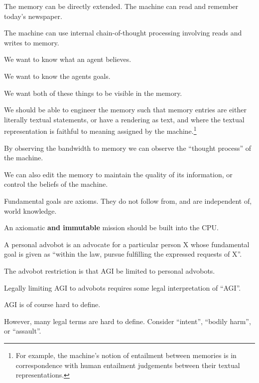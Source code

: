 {\vfill
The memory can be directly extended. The machine can read and remember today's newspaper.

\vfill
The machine can use internal chain-of-thought processing involving reads and writes to memory.



We want to know what an agent believes.

\vfill
We want to know the agents goals.

\vfill
We want both of these things to be visible in the memory.


\vfill
We should be able to engineer the memory such that memory entries are either literally textual statements,
or have a rendering as text, and where the textual representation is faithful to meaning assigned by the machine.\footnote{\Large For example, the machine's notion of entailment
between memories is in correspondence with human entailment judgements between their textual representations.}

\vfill
By observing the bandwidth to memory we can observe the ``thought process'' of the machine.

\vfill
We can also edit the memory to maintain the quality of its information, or control the beliefs of the machine.


Fundamental goals are axioms.  They do not follow from, and are independent of, world knowledge.

\vfill
An axiomatic {\bf and immutable} mission should be built into the CPU.


A personal advobot is an advocate for a particular person X whose fundamental goal is given as ``within the law, pursue fulfilling the expressed requests of X''.

\vfill
The advobot restriction is that AGI be limited to personal advobots.


Legally limiting AGI to advobots requires some legal interpretation of ``AGI''.

\vfill
AGI is of course hard to define.

\vfill
However, many legal terms are hard to define.  Consider ``intent'', ``bodily harm'', or ``assault''.

}
